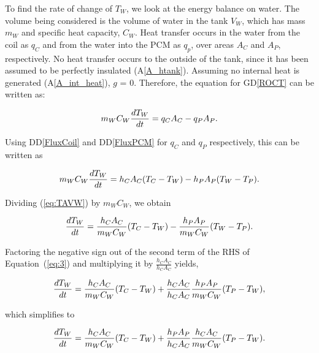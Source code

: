\documentclass[12pt]{article}
\newcommand{\dref}[1]{GD\ref{#1}}
\newcommand{\ddref}[1]{DD\ref{#1}}
\newcommand{\aref}[1]{A\ref{#1}}
\begin{document}
To find the rate of change of $T_W$, we look at the energy balance on water.
The volume being considered is the volume of water in the tank $V_W$, which has
mass $m_W$ and specific heat capacity, $C_W$.  Heat transfer occurs in the water
from the coil as $q_C$ and from the water into the PCM as $q_p$, over areas
$A_C$ and $A_P$, respectively.  No heat transfer occurs to the outside of the
tank, since it has been assumed to be perfectly insulated (\aref{A_htank}).
Assuming no internal heat is generated (\aref{A_int_heat}), $g$ = 0.  Therefore,
the equation for \dref{ROCT} can be written as:

\begin{equation*}
\\m_W C_W \frac{dT_W}{dt} = q_C A_C - q_P A_P.
\end{equation*}

\noindent
Using \ddref{FluxCoil} and \ddref{FluxPCM} for $q_C$ and $q_P$ respectively,
this can be written as

\begin{equation}
\\m_W C_W \frac{dT_W}{dt} = h_C A_C (T_C - T_W) - h_P A_P (T_W - T_P). \label{eq:TAVW}
\end{equation}

\noindent
Dividing (\ref{eq:TAVW}) by $m_W C_W$, we obtain

\begin{equation}
\\ \frac{dT_W}{dt} = \frac{h_C A_C}{m_W C_W} (T_C - T_W) - 
\frac{h_P A_P}{m_WC_W} (T_W - T_P).\label{eq:3}
\end{equation}

\noindent

Factoring the negative sign out of the second term of the RHS of
Equation~(\ref{eq:3}) and multiplying it by $\frac{h_C A_C}{h_C A_C}$ yields,

\begin{equation*}
\\ \frac{dT_W}{dt} = \frac{h_C A_C}{m_W C_W} (T_C - T_W) + 
\frac{h_C A_C}{h_C A_C} \frac{h_P A_P}{m_WC_W} (T_P - T_W),
\end{equation*}

\noindent
which simplifies to

\begin{equation}
\\ \frac{dT_W}{dt} = \frac{h_C A_C}{m_W C_W} (T_C - T_W) + 
\frac{h_P A_P}{h_C A_C} \frac{h_C A_C}{m_WC_W} (T_P - T_W).\label{eq:4}
\end{equation}
\end{document}
